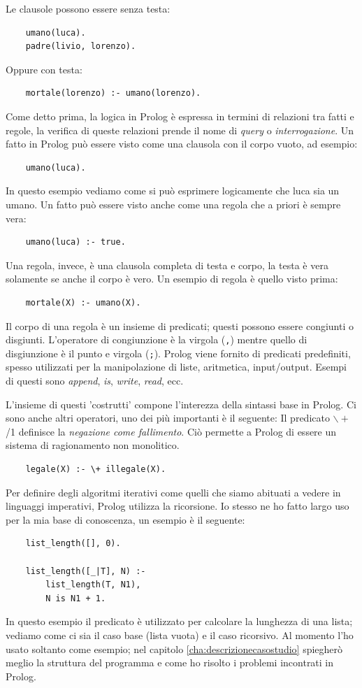 Le clausole possono essere senza testa:
\begin{verbatim}
    umano(luca).
    padre(livio, lorenzo).
\end{verbatim}
Oppure con testa:
\begin{verbatim}
    mortale(lorenzo) :- umano(lorenzo).
\end{verbatim}

Come detto prima, la logica in Prolog è espressa in termini di relazioni tra fatti e regole, la verifica di queste relazioni
prende il nome di \textit{query} o \textit{interrogazione}.
Un fatto in Prolog può essere visto come una clausola con il corpo vuoto, ad esempio:
\begin{verbatim}
    umano(luca).
\end{verbatim}
In questo esempio vediamo come si può esprimere logicamente che luca sia un umano.
Un fatto può essere visto anche come una regola che a priori è sempre vera:
\begin{verbatim}
    umano(luca) :- true.
\end{verbatim}
Una regola, invece, è una clausola completa di testa e corpo, la testa è vera solamente se anche il corpo è vero.
Un esempio di regola è quello visto prima:
\begin{verbatim}
    mortale(X) :- umano(X).
\end{verbatim}

Il corpo di una regola è un insieme di predicati; questi possono essere congiunti o disgiunti. L'operatore di congiunzione è la
virgola (\verb+,+) mentre quello di disgiunzione è il punto e virgola (\verb+;+). Prolog viene fornito di predicati predefiniti, spesso
utilizzati per la manipolazione di liste, aritmetica, input/output. Esempi di questi sono \textit{append}, \textit{is}, \textit{write}, \textit{read}, ecc.

L'insieme di questi 'costrutti' compone l'interezza della sintassi base in Prolog. Ci sono anche altri operatori, uno dei più importanti è il seguente:
Il predicato $\backslash+$ /1 definisce la \textit{negazione come fallimento}. Ciò permette a Prolog di essere un sistema di ragionamento non monolitico.
\begin{verbatim}
    legale(X) :- \+ illegale(X).
\end{verbatim}

Per definire degli algoritmi iterativi come quelli che siamo abituati a vedere in linguaggi imperativi, Prolog utilizza la ricorsione. Io stesso ne ho fatto largo uso per la mia base di conoscenza,
un esempio è il seguente:
\begin{lstlisting}
    list_length([], 0).

    list_length([_|T], N) :-
        list_length(T, N1),
        N is N1 + 1.
\end{lstlisting}
In questo esempio il predicato è utilizzato per calcolare la lunghezza di una lista; vediamo come ci sia il caso base (lista vuota) e il caso ricorsivo.
Al momento l'ho usato soltanto come esempio; nel capitolo \ref{cha:descrizionecasostudio} spiegherò meglio la struttura del programma e come ho risolto i problemi incontrati in Prolog.
